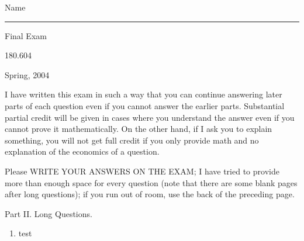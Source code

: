 \documentclass[]{examCDC}
\begin{document}
{\begin{flushright}Name \rule{50mm}{.1mm}\end{flushright}}
\medskip

\centerline{\Large Final Exam}
\centerline{\large 180.604}
\centerline{\large Spring, 2004}

\medskip
\medskip

I have written this exam in such a way that you can continue answering
later parts of each question even if you cannot answer the earlier
parts.  Substantial partial credit will be given in cases where you
understand the answer even if you cannot prove it mathematically.  On
the other hand, if I ask you to explain something, you will not get
full credit if you only provide math and no explanation of the
economics of a question.

Please WRITE YOUR ANSWERS ON THE EXAM; I have tried to provide more
than enough space for every question (note that there are some blank
pages after long questions); if you run out of room, use the back of
the preceding page.

\pagebreak

%
\vfill\pagebreak

\centerline{\Large Part II. Long Questions.} \medskip\medskip\medskip

\begin{enumerate}

\item test

\end{enumerate}



\end{document}
